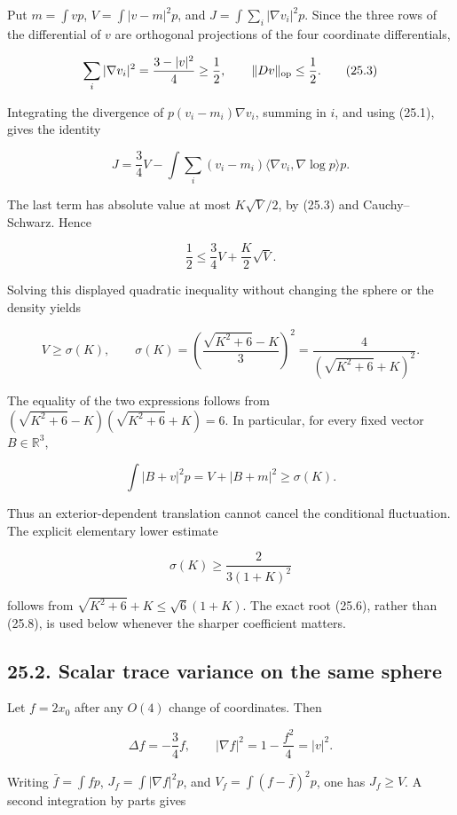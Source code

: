 \documentclass[
]{article}
\begin{document}
Put \(m=\int v p\), \(V=\int|v-m|^2p\), and
\(J=\int\sum_i|\nabla v_i|^2p\). Since the three rows of the
differential of \(v\) are orthogonal projections of the four coordinate
differentials,

\[
 \sum_i|\nabla v_i|^2=\frac{3-|v|^2}{4}\ge\frac12,
 \qquad \|D v\|_{\rm op}\le\frac12.
 \tag{25.3}
\]

Integrating the divergence of \(p(v_i-m_i)\nabla v_i\), summing in
\(i\), and using (25.1), gives the identity

\[
 J=\frac34V-
 \int\sum_i(v_i-m_i)\langle\nabla v_i,\nabla\log p\rangle p.
 \tag{25.4}
\]

The last term has absolute value at most \(K\sqrt V/2\), by (25.3) and
Cauchy--Schwarz. Hence

\[
 \frac12\le\frac34V+\frac K2\sqrt V.
 \tag{25.5}
\]

Solving this displayed quadratic inequality without changing the sphere
or the density yields

\[
 V\ge \sigma(K),
 \qquad
 \sigma(K)=
 \left(\frac{\sqrt{K^2+6}-K}{3}\right)^2
 =\frac4{(\sqrt{K^2+6}+K)^2}.
 \tag{25.6}
\]

The equality of the two expressions follows from
\((\sqrt{K^2+6}-K)(\sqrt{K^2+6}+K)=6\). In particular, for every fixed
vector \(B\in\mathbb R^3\),

\[
 \int|B+v|^2p
 =V+|B+m|^2\ge\sigma(K).
 \tag{25.7}
\]

Thus an exterior-dependent translation cannot cancel the conditional
fluctuation. The explicit elementary lower estimate

\[
 \sigma(K)\ge\frac2{3(1+K)^2}
 \tag{25.8}
\]

follows from \(\sqrt{K^2+6}+K\le\sqrt6(1+K)\). The exact root (25.6),
rather than (25.8), is used below whenever the sharper coefficient
matters.

\subsection{25.2. Scalar trace variance on the same
sphere}\label{scalar-trace-variance-on-the-same-sphere}

Let \(f=2x_0\) after any \(O(4)\) change of coordinates. Then

\[
 \Delta f=-\frac34f,
 \qquad |\nabla f|^2=1-\frac{f^2}{4}=|v|^2.
 \tag{25.9}
\]

Writing \(\bar f=\int fp\), \(J_f=\int|\nabla f|^2p\), and
\(V_f=\int(f-\bar f)^2p\), one has \(J_f\ge V\). A second integration by
parts gives
\end{document}
